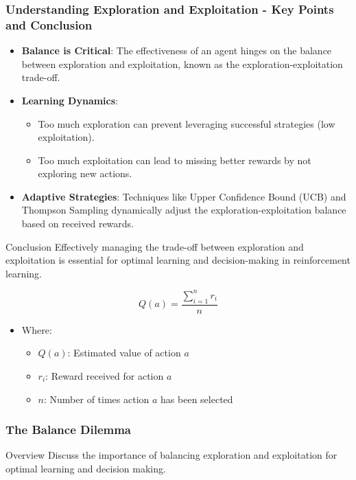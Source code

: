 \documentclass[aspectratio=169]{beamer}
\begin{document}
\begin{frame}[fragile]
    \frametitle{Understanding Exploration and Exploitation - Key Points and Conclusion}
    \begin{itemize}
        \item \textbf{Balance is Critical}: The effectiveness of an agent hinges on the balance between exploration and exploitation, known as the exploration-exploitation trade-off.
        \item \textbf{Learning Dynamics}: 
        \begin{itemize}
            \item Too much exploration can prevent leveraging successful strategies (low exploitation).
            \item Too much exploitation can lead to missing better rewards by not exploring new actions.
        \end{itemize}
        \item \textbf{Adaptive Strategies}: Techniques like Upper Confidence Bound (UCB) and Thompson Sampling dynamically adjust the exploration-exploitation balance based on received rewards.
    \end{itemize}
    
    \begin{block}{Conclusion}
        Effectively managing the trade-off between exploration and exploitation is essential for optimal learning and decision-making in reinforcement learning.
    \end{block}
    
    \begin{equation}
        Q(a) = \frac{\sum_{i=1}^{n} r_i}{n}
    \end{equation}
    \begin{itemize}
        \item Where: 
        \begin{itemize}
            \item $Q(a)$: Estimated value of action $a$
            \item $r_i$: Reward received for action $a$
            \item $n$: Number of times action $a$ has been selected
        \end{itemize}
    \end{itemize}
\end{frame}

\begin{frame}[fragile]
    \frametitle{The Balance Dilemma}
    \begin{block}{Overview}
        Discuss the importance of balancing exploration and exploitation for optimal learning and decision making.
    \end{block}
\end{frame}
\end{document}
